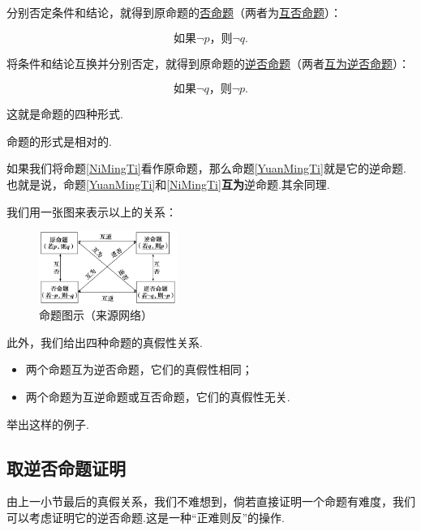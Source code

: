 \documentclass[lang=cn,math=cm,chinesefont=nofont,11pt,scheme=chinese,twocol]{elegantbook}
\begin{document}
分别否定条件和结论，就得到原命题的\underline{否命题}（两者为\underline{互否命题}）：

\begin{equation}\label{FouMingTi}
  \text{如果}\neg p\text{，则}\neg q.
\end{equation}

将条件和结论互换并分别否定，就得到原命题的\underline{逆否命题}（两者\underline{互为逆否命题}）：

\begin{equation}\label{NiFouMingTi}
  \text{如果}\neg q\text{，则}\neg p.
\end{equation}

这就是命题的四种形式.

命题的形式是相对的.

如果我们将命题\ref{NiMingTi}看作原命题，那么命题\ref{YuanMingTi}就是它的逆命题.也就是说，命题\ref{YuanMingTi}和\ref{NiMingTi}\textbf{互为}逆命题.其余同理.

我们用一张图来表示以上的关系：

\begin{figure}[h]
  \centering
  \includegraphics[width=0.4\textwidth]{image/proposition.png}
  \caption{命题图示（来源网络）}
  \label{img:proposition}
\end{figure}

此外，我们给出四种命题的真假性关系.

\begin{itemize}
  \item 两个命题互为逆否命题，它们的真假性相同；
  \item 两个命题为互逆命题或互否命题，它们的真假性无关.
\end{itemize}

\begin{problem}
  举出这样的例子.
\end{problem}

\subsection{取逆否命题证明}

由上一小节最后的真假关系，我们不难想到，倘若直接证明一个命题有难度，我们可以考虑证明它的逆否命题.这是一种“正难则反”的操作.
\end{document}

